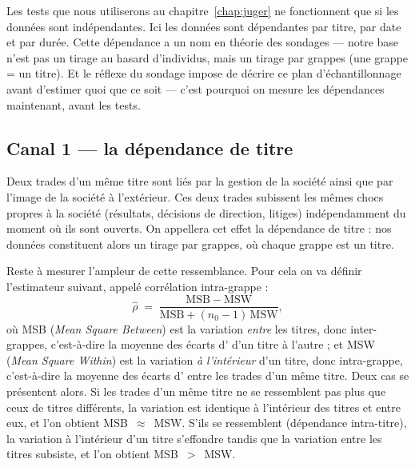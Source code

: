 Les tests que nous utiliserons au chapitre~\ref{chap:juger} ne fonctionnent que
si les données sont indépendantes.
Ici les données sont dépendantes par titre, par date et par durée.
Cette dépendance a un nom en théorie des sondages — notre base
n'est pas un tirage au hasard d'individus, mais un tirage par
grappes (une grappe = un titre). Et le réflexe du sondage 
impose de décrire ce plan d'échantillonnage avant d'estimer
quoi que ce soit — c'est pourquoi on mesure les dépendances 
maintenant, avant les tests.

\subsection{Canal 1 --- la dépendance de titre}
\label{sec:dep-canal1}


Deux trades d'un même titre sont liés par la gestion de la société
ainsi que par l'image de la société à l'extérieur.
Ces deux trades subissent les mêmes chocs propres à la société (résultats,
décisions de direction, litiges) indépendamment du moment où ils sont
ouverts.
On appellera cet effet la dépendance de titre : nos données constituent
alors un tirage par grappes, où chaque grappe est un titre.

Reste à mesurer l'ampleur de cette ressemblance. Pour cela on va définir
l'estimateur suivant, appelé corrélation intra-grappe :
\[
  \hat\rho \;=\; \frac{\mathrm{MSB}-\mathrm{MSW}}
                      {\mathrm{MSB} + (n_0 - 1)\,\mathrm{MSW}},
\]
où MSB (\emph{Mean Square Between}) est la variation \emph{entre} les
titres, donc inter-grappes, c'est-à-dire la moyenne des écarts d'\edgevar{}
d'un titre à l'autre ; et MSW (\emph{Mean Square Within}) est la variation
\emph{à l'intérieur} d'un titre, donc intra-grappe, c'est-à-dire la moyenne
des écarts d'\edgevar{} entre les trades d'un même titre.
Deux cas se présentent alors. Si les trades d'un même titre ne se ressemblent
pas plus que ceux de titres différents, la variation est identique à
l'intérieur des titres et entre eux, et l'on obtient MSB~$\approx$~MSW. S'ils
se ressemblent (dépendance intra-titre), la variation à l'intérieur d'un titre
s'effondre tandis que la variation entre les titres subsiste, et l'on obtient
MSB~$>$~MSW.

